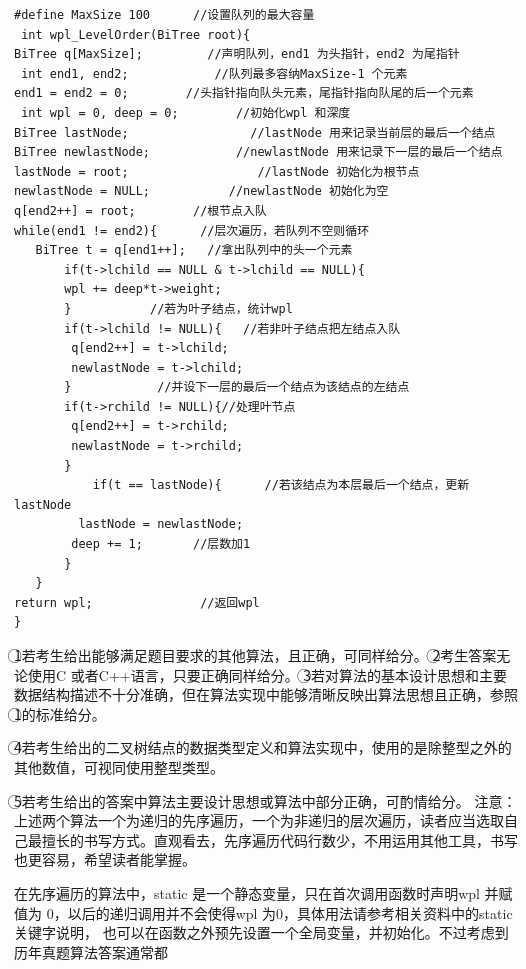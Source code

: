 \documentclass[UTF8,11pt]{ctexart}
\begin{document}
\begin{Verbatim}[breaklines,breakanywhere,fontsize=\small]
#define MaxSize 100      //设置队列的最大容量
 int wpl_LevelOrder(BiTree root){
BiTree q[MaxSize];         //声明队列，end1 为头指针，end2 为尾指针
 int end1, end2;            //队列最多容纳MaxSize-1 个元素
end1 = end2 = 0;        //头指针指向队头元素，尾指针指向队尾的后一个元素
 int wpl = 0, deep = 0;        //初始化wpl 和深度
BiTree lastNode;                 //lastNode 用来记录当前层的最后一个结点
BiTree newlastNode;            //newlastNode 用来记录下一层的最后一个结点
lastNode = root;                  //lastNode 初始化为根节点
newlastNode = NULL;           //newlastNode 初始化为空
q[end2++] = root;        //根节点入队
while(end1 != end2){      //层次遍历，若队列不空则循环
   BiTree t = q[end1++];   //拿出队列中的头一个元素
       if(t->lchild == NULL & t->lchild == NULL){
       wpl += deep*t->weight;
       }           //若为叶子结点，统计wpl
       if(t->lchild != NULL){   //若非叶子结点把左结点入队
        q[end2++] = t->lchild;
        newlastNode = t->lchild;
       }            //并设下一层的最后一个结点为该结点的左结点
       if(t->rchild != NULL){//处理叶节点
        q[end2++] = t->rchild;
        newlastNode = t->rchild;
       }
           if(t == lastNode){      //若该结点为本层最后一个结点，更新lastNode
         lastNode = newlastNode;
        deep += 1;       //层数加1
       }
   }
return wpl;               //返回wpl
}
\end{Verbatim}

\textcircled{1}若考生给出能够满足题目要求的其他算法，且正确，可同样给分。
  \textcircled{2}考生答案无论使用C 或者C++语言，只要正确同样给分。
  \textcircled{3}若对算法的基本设计思想和主要数据结构描述不十分准确，但在算法实现中能够清晰反映出算法思想且正确，参照\textcircled{1}的标准给分。


\textcircled{4}若考生给出的二叉树结点的数据类型定义和算法实现中，使用的是除整型之外的其他数值，可视同使用整型类型。


\textcircled{5}若考生给出的答案中算法主要设计思想或算法中部分正确，可酌情给分。 注意：上述两个算法一个为递归的先序遍历，一个为非递归的层次遍历，读者应当选取自己最擅长的书写方式。直观看去，先序遍历代码行数少，不用运用其他工具，书写也更容易，希望读者能掌握。


在先序遍历的算法中，static 是一个静态变量，只在首次调用函数时声明wpl 并赋值为 0，以后的递归调用并不会使得wpl 为0，具体用法请参考相关资料中的static 关键字说明， 也可以在函数之外预先设置一个全局变量，并初始化。不过考虑到历年真题算法答案通常都
\end{document}
